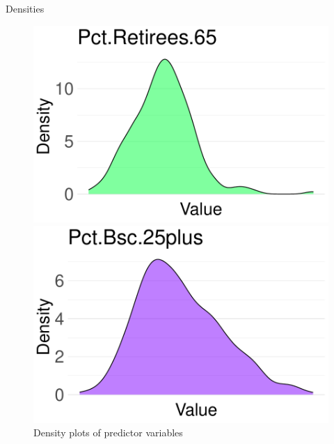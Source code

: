 \documentclass{beamer}
\begin{document}
\begin{frame}{Densities}
\begin{figure}
    \begin{minipage}{0.3\textwidth}
        \centering
        \includegraphics[width=\textwidth]{plots/Pct.Retirees.65_density_plot.pdf}
    \end{minipage}
    \hfill
    \begin{minipage}{0.3\textwidth}
        \centering
        \includegraphics[width=\textwidth]{plots/Pct.Bsc.25plus_density_plot.pdf}
    \end{minipage}
    \hfill
    \begin{minipage}{0.3\textwidth}
        \hfill
    \end{minipage}

    \caption{Density plots of predictor variables}
    
\end{figure}
      
\end{frame}
\end{document}
